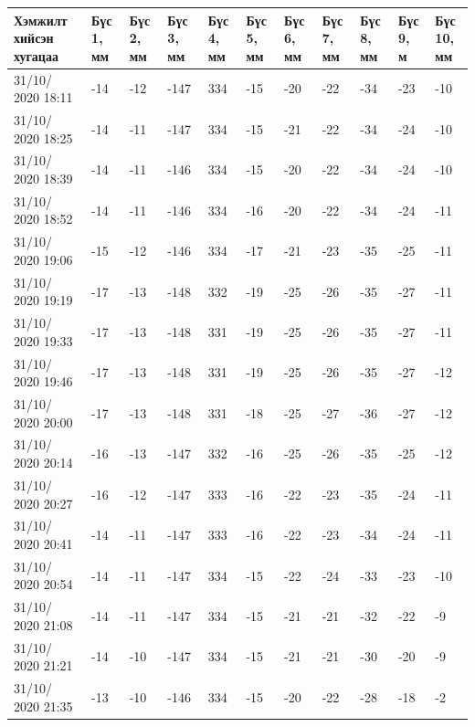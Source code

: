\begin{table}[h]
    \centering
    \begin{tabular}{|p{1.5cm}|p{0.8cm}|p{0.8cm}|p{0.8cm}|p{0.8cm}|p{0.8cm}|p{0.8cm}|p{0.8cm}|p{0.8cm}|p{0.8cm}|p{0.8cm}|}
         \hline
     Хэмжилт хийсэн хугацаа & Бүс 1, мм&	Бүс 2, мм&	Бүс 3, мм&	Бүс 4, мм&	Бүс 5, мм&	Бүс 6, мм&	Бүс 7, мм&	Бүс 8, мм&	Бүс 9, м&	Бүс 10, мм\\ \hline
31/10/ 2020 18:11&	-14&-12&-147&	334&-15&-20&-22&-34&-23&-10\\ \hline
31/10/ 2020 18:25&	-14&-11&-147&	334&-15&-21&-22&-34&-24&-10\\ \hline
31/10/ 2020 18:39&	-14&-11&-146&	334&-15&-20&-22&-34&-24&-10\\ \hline
31/10/ 2020 18:52&	-14&-11&-146&	334&-16&-20&-22&-34&-24&-11\\ \hline
31/10/ 2020 19:06&	-15&-12&-146&	334&-17&-21&-23&-35&-25&-11\\ \hline
31/10/ 2020 19:19&	-17&-13&-148&	332&-19&-25&-26&-35&-27&-11\\ \hline
31/10/ 2020 19:33&	-17&-13&-148&	331&-19&-25&-26&-35&-27&-11\\ \hline
31/10/ 2020 19:46&	-17&-13&-148&	331&-19&-25&-26&-35&-27&-12\\ \hline
31/10/ 2020 20:00&	-17&-13&-148&	331&-18&-25&-27&-36&-27&-12\\ \hline
31/10/ 2020 20:14&	-16&-13&-147&	332&-16&-25&-26&-35&-25&-12\\ \hline
31/10/ 2020 20:27&	-16&-12&-147&	333&-16&-22&-23&-35&-24&-11\\ \hline
31/10/ 2020 20:41&	-14&-11&-147&	333&-16&-22&-23&-34&-24&-11\\ \hline
31/10/ 2020 20:54&	-14&-11&-147&	334&-15&-22&-24&-33&-23&-10\\ \hline
31/10/ 2020 21:08&	-14&-11&-147&	334&-15&-21&-21&-32&-22&-9\\ \hline
31/10/ 2020 21:21&	-14&-10&-147&	334&-15&-21&-21&-30&-20&-9\\ \hline
31/10/ 2020 21:35&	-13&-10&-146&	334&-15&-20&-22&-28&-18&-2\\ \hline
    \end{tabular}
\end{table}
